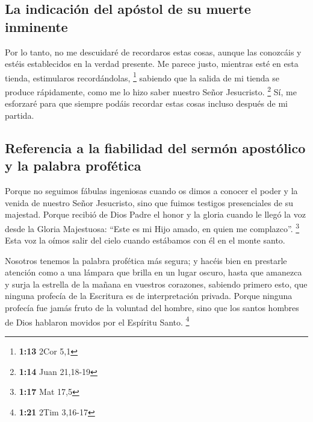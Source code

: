 \begin{paracol}{2}
\hypertarget{la-indicaciuxf3n-del-apuxf3stol-de-su-muerte-inminente}{%
\subsection{La indicación del apóstol de su muerte
inminente}\label{la-indicaciuxf3n-del-apuxf3stol-de-su-muerte-inminente}}

 Por lo tanto, no me descuidaré de recordaros estas
cosas, aunque las conozcáis y estéis establecidos en la verdad presente.
 Me parece justo, mientras esté en esta tienda,
estimularos recordándolas, \footnote{\textbf{1:13} 2Cor 5,1}
 sabiendo que la salida de mi tienda se produce
rápidamente, como me lo hizo saber nuestro Señor Jesucristo. \footnote{\textbf{1:14}
  Juan 21,18-19}  Sí, me esforzaré para que siempre
podáis recordar estas cosas incluso después de mi partida.

\hypertarget{referencia-a-la-fiabilidad-del-sermuxf3n-apostuxf3lico-y-la-palabra-profuxe9tica}{%
\subsection{Referencia a la fiabilidad del sermón apostólico y la
palabra
profética}\label{referencia-a-la-fiabilidad-del-sermuxf3n-apostuxf3lico-y-la-palabra-profuxe9tica}}

 Porque no seguimos fábulas ingeniosas cuando os dimos a
conocer el poder y la venida de nuestro Señor Jesucristo, sino que
fuimos testigos presenciales de su majestad.  Porque
recibió de Dios Padre el honor y la gloria cuando le llegó la voz desde
la Gloria Majestuosa: ``Este es mi Hijo amado, en quien me complazco''.
\footnote{\textbf{1:17} Mat 17,5}  Esta voz la oímos
salir del cielo cuando estábamos con él en el monte santo.

 Nosotros tenemos la palabra profética más segura; y
hacéis bien en prestarle atención como a una lámpara que brilla en un
lugar oscuro, hasta que amanezca y surja la estrella de la mañana en
vuestros corazones,  sabiendo primero esto, que ninguna
profecía de la Escritura es de interpretación privada. 
Porque ninguna profecía fue jamás fruto de la voluntad del hombre, sino
que los santos hombres de Dios hablaron movidos por el Espíritu Santo.
\footnote{\textbf{1:21} 2Tim 3,16-17}

\switchcolumn
\begin{otherlanguage}{english}


\end{otherlanguage}
\end{paracol}

